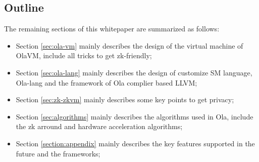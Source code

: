 \subsection{Outline}

The remaining sections of this whitepaper are summarized as follows:
\begin{itemize}
    \item Section \ref{sec:ola-vm} mainly describes the design of the virtual machine of OlaVM, include all tricks to get zk-friendly;
    \item Section \ref{sec:ola-lang} mainly describes the design of customize SM language, Ola-lang and the framework of Ola complier based LLVM;
    \item Section \ref{sec:zk-zkvm} mainly describes some key points to get privacy;
    \item Section \ref{sec:algorithms} mainly describes the algorithms used in Ola, include the zk arround and hardware acceleration algorithms;
    \item Section \ref{section:appendix} mainly describes the key features supported in the future and the frameworks;
\end{itemize}